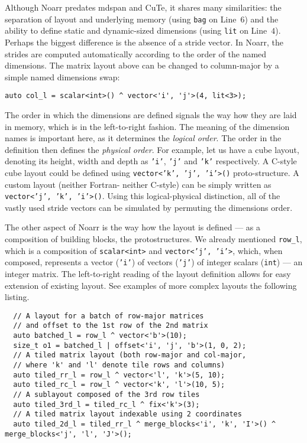 Although Noarr predates mdspan and CuTe, it shares many similarities: the separation of layout and underlying memory (using \texttt{bag} on Line~$6$) and the ability to define static and dynamic-sized dimensions (using \texttt{lit} on Line~$4$). Perhaps the biggest difference is the absence of a stride vector. In Noarr, the strides are computed automatically according to the order of the named dimensions. The matrix layout above can be changed to column-major by a simple named dimensions swap:
\begin{verbatim}
auto col_l = scalar<int>() ^ vector<'i', 'j'>(4, lit<3>);
\end{verbatim}
The order in which the dimensions are defined signals the way how they are laid in memory, which is in the left-to-right fashion. The meaning of the dimension names is important here, as it determines the \emph{logical order}. The order in the definition then defines the \emph{physical order}. For example, let us have a cube layout, denoting its height, width and depth as \texttt{'i'}, \texttt{'j'} and \texttt{'k'} respectively. A C-style cube layout could be defined using \texttt{vector<'k', 'j', 'i'>()} proto-structure. A custom layout (neither Fortran- neither C-style) can be simply written as \texttt{vector<'j', 'k', 'i'>()}. Using this logical-physical distinction, all of the vastly used stride vectors can be simulated by permuting the dimensions order.

The other aspect of Noarr is the way how the layout is defined --- as a composition of building blocks, the protostructures. We already mentioned \texttt{row\_l}, which is a composition of \texttt{scalar<int>} and \texttt{vector<'j', 'i'>}, which, when composed, represents a vector (\texttt{'i'}) of vectors (\texttt{'j'}) of integer scalars (\texttt{int}) --- an integer matrix. The left-to-right reading of the layout definition allows for easy extension of existing layout. See examples of more complex layouts the following listing.

  \begin{verbatim}
  // A layout for a batch of row-major matrices
  // and offset to the 1st row of the 2nd matrix
  auto batched_l = row_l ^ vector<'b'>(10);
  size_t o1 = batched_l | offset<'i', 'j', 'b'>(1, 0, 2);
  // A tiled matrix layout (both row-major and col-major, 
  // where 'k' and 'l' denote tile rows and columns)
  auto tiled_rr_l = row_l ^ vector<'l', 'k'>(5, 10);
  auto tiled_rc_l = row_l ^ vector<'k', 'l'>(10, 5);
  // A sublayout composed of the 3rd row tiles 
  auto tiled_3rd_l = tiled_rc_l ^ fix<'k'>(3);
  // A tiled matrix layout indexable using 2 coordinates
  auto tiled_2d_l = tiled_rr_l ^ merge_blocks<'i', 'k', 'I'>() ^ merge_blocks<'j', 'l', 'J'>();
  \end{verbatim}


